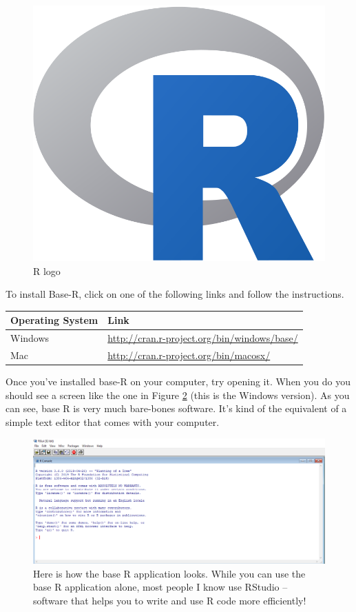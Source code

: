 \documentclass[
]{book}
\begin{document}
\begin{figure}

{\centering \includegraphics[width=0.4\linewidth]{images/chapter-1/Rlogo} 

}

\caption{R logo}\label{fig:rlogo}
\end{figure}

To install Base-R, click on one of the following links and follow the instructions.

\begin{longtable}[]{@{}ll@{}}
\toprule
Operating System & Link \\
\midrule
\endhead
Windows & \url{http://cran.r-project.org/bin/windows/base/} \\
Mac & \url{http://cran.r-project.org/bin/macosx/} \\
\bottomrule
\end{longtable}

Once you've installed base-R on your computer, try opening it. When you do you should see a screen like the one in Figure \ref{fig:rscreenshot} (this is the Windows version). As you can see, base R is very much bare-bones software. It's kind of the equivalent of a simple text editor that comes with your computer.

\begin{figure}

{\centering \includegraphics[width=0.75\linewidth]{images/chapter-1/RScreenshot} 

}

\caption{Here is how the base R application looks. While you can use the base R application alone, most people I know use RStudio -- software that helps you to write and use R code more efficiently!}\label{fig:rscreenshot}
\end{figure}
\end{document}
